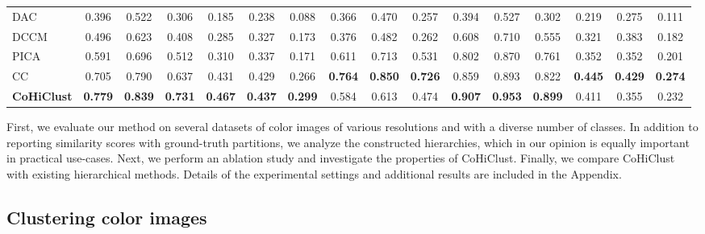 \documentclass[runningheads]{llncs}
\def\our{CoHiClust}
\begin{document}
\begin{table}[t]
\begin{tabular}{lccccccccccccccc}
DAC \cite{Chang_2017_ICCV} & 0.396 & 0.522 & 0.306 & 0.185 & 0.238 & 0.088 &  0.366 & 0.470 & 0.257 & 0.394 & 0.527 & 0.302 & 0.219 & 0.275 & 0.111 \\
DCCM \cite{Wu_2019_ICCV} & 0.496 & 0.623 & 0.408 & 0.285 & 0.327 & 0.173 & 0.376 & 0.482 & 0.262 & 0.608 & 0.710 & 0.555 & 0.321 & 0.383 & 0.182 \\
PICA \cite{huang2020deep} & 0.591 & 0.696 & 0.512 & 0.310 & 0.337  & 0.171  & 0.611 & 0.713 & 0.531 & 0.802 & 0.870 & 0.761 & 0.352 & 0.352 & 0.201 \\
CC \cite{Li2021contrastive_clustering} & 0.705 & 0.790 & 0.637 & 0.431 & 0.429 & 0.266 & \textbf{0.764} & \textbf{0.850} & \textbf{0.726} & 0.859 & 0.893 & 0.822 & \textbf{0.445} & \textbf{0.429} & \textbf{0.274}\\
{\bf \our{}} & \textbf{0.779} & \textbf{0.839} & \textbf{0.731} & \textbf{0.467} & \textbf{0.437} & \textbf{0.299}  & 0.584 & 0.613 & 0.474 & \textbf{0.907} & \textbf{0.953} & \textbf{0.899} & 0.411 & 0.355 & 0.232 \\ 
\bottomrule
\end{tabular}
\end{table}




First, we evaluate our method on several datasets of color images of various resolutions and with a diverse number of classes. In addition to reporting similarity scores with ground-truth partitions, we analyze the constructed hierarchies, which in our opinion is equally important in practical use-cases. Next, we perform an ablation study and investigate the properties of \our{}. Finally, we compare \our{} with existing hierarchical methods. Details of the experimental settings and additional results are included in the Appendix.











\subsection{Clustering color images}
\end{document}
